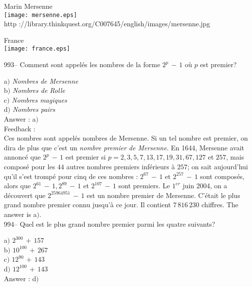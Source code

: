﻿\documentclass[letterpaper, 12pt]{article}
\begin{document}
        \begin{center}
        Marin Mersenne\\
    \texttt{[image: mersenne.eps]}\\
        {\footnotesize http
://library.thinkquest.org/C007645/english/images/mersenne.jpg}
    \end{center}

        \begin{center}
        France\\
    \texttt{[image: france.eps]}\\
    \end{center}

993-- Comment sont appel\'es les nombres de la forme $2^p\,-\,1$
o\`u $p$ est premier?

a$)$ {\sl Nombres de Mersenne} \\
b$)$ {\sl Nombres de Rolle} \\
c$)$ {\sl Nombres magiques} \\
d$)$ {\sl Nombres pairs}\\

Answer : a$)$\\

Feedback : \\
Ces nombres sont appel\'es nombres de Mersenne. Si un tel nombre est
premier, on dira de plus que c'est un {\sl nombre premier de
Mersenne}. En 1644, Mersenne avait annonc\'e que $2^p\,-\,1$ est
premier si $p=2,3,5,7,13,17,19,31,67,127$ et $257$, mais compos\'e
pour les $44$ autres nombres premiers inf\'erieurs \`a $257$; on
sait aujourd'hui qu'il s'est tromp\'e pour cinq de ces nombres :
$2^{67}\,-\,1$ et $2^{257}\,-\,1$ sont compos\'es, alors que
$2^{61}\,-\,1,2^{89}\,-\,1$ et $2^{107}\,-\,1$ sont premiers. Le
$1^{er}$ juin 2004, on a d\'ecouvert que $2^{25 964 951}\,-\,1$ est
un nombre premier de Mersenne. C'\'etait le plus grand nombre
premier connu jusqu'\`a ce jour. Il contient $7\,816\,230$ chiffres.
The answer is a$)$.\\

994-- Quel est le plus grand nombre premier parmi les quatre
suivants?

a$)$ $2^{300}\,+\,157$ \\
b$)$ $10^{100}\,+\,267$ \\
c$)$ $12^{90}\,+\,143$ \\
d$)$ $12^{100}\,+\,143$\\

Answer : d$)$\\
\end{document}
